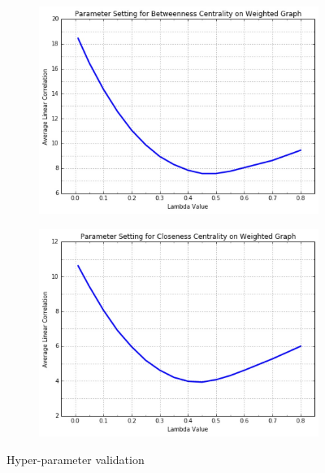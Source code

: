 \documentclass[10pt]{beamer}
\begin{document}
\begin{frame}
\begin{figure}[H]

\vspace{-0.1in}

\centering
\begin{subfigure}{.4\textwidth}
  \centering
  \includegraphics[width=0.95\linewidth]{BCW_2.jpeg}
\end{subfigure}
\begin{subfigure}{.4\textwidth}
	\centering
    \includegraphics[width=0.95\linewidth]{CCW_2.jpeg}
\end{subfigure}
\caption{Hyper-parameter validation}
\end{figure}
\end{frame}
\end{document}
